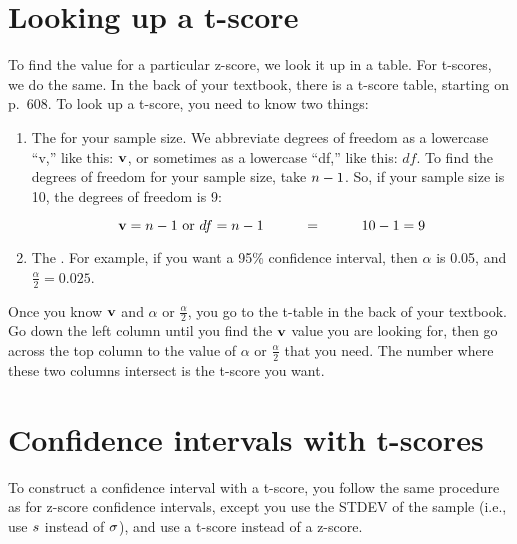 \documentclass[../../../main.tex]{subfiles}
\begin{document}
\section{Looking up a t-score}

To find the value for a particular z-score, we look it up in a table. For t-scores, we do the same. In the back of your textbook, there is a t-score table, starting on p.~608. To look up a t-score, you need to know two things: 

\begin{enumerate}
  \item The  for your sample size. We abbreviate degrees of freedom as a lowercase ``v,'' like this: $\DegFreedom/$, or sometimes as a lowercase ``df,'' like this: $df$. To find the degrees of freedom for your sample size, take $\samplesize/ - 1$. So, if your sample size is 10, the degrees of freedom is 9: 
  
  \begin{equation*}
    \DegFreedom/ = \samplesize/ - 1 \text{ or }df = \samplesize/ - 1 \hskip 1cm = \hskip 1cm 10 - 1 = 9
  \end{equation*}

  \item The . For example, if you want a 95\% confidence interval, then $\alpha$ is 0.05, and $\frac{\alpha}{2} = 0.025$.

\end{enumerate}

\noindent
Once you know $\DegFreedom/$ and $\alpha$ or $\frac{\alpha}{2}$, you go to the t-table in the back of your textbook. Go down the left column until you find the $\DegFreedom/$ value you are looking for, then go across the top column to the value of $\alpha$ or $\frac{\alpha}{2}$ that you need. The number where these two columns intersect is the t-score you want.


\section{Confidence intervals with t-scores}

To construct a confidence interval with a t-score, you follow the same procedure as for z-score confidence intervals, except you use the STDEV of the sample (i.e., use $s$ instead of $\sigma$), and use a t-score instead of a z-score.
\end{document}
